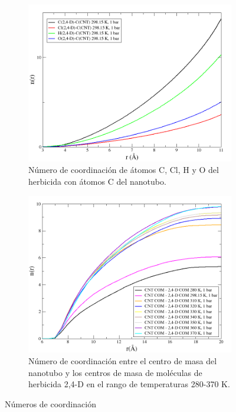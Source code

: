 \begin{figure}[!ht]
\begin{subfigure}{.5\textwidth}
  \centering
  \includegraphics[width=1\linewidth]{resultados/gr_24D_CNT_298_15_atom_atom_cn_alt.png}  
  \caption{Número de coordinación de átomos C, Cl, H y O del herbicida con átomos C del nanotubo.}
  \label{fig:24D_CNT_298_15_atom_atom_cn}
\end{subfigure}
\begin{subfigure}{.5\textwidth}
  \centering
  \includegraphics[width=1\linewidth]{resultados/cmnt_cmd_alltemp.png}  
  \caption{Número de coordinación entre el centro de masa del nanotubo y los centros de masa de moléculas de herbicida 2,4-D en el rango de temperaturas 280-370 K.}
  \label{fig:24D_CNT_alltemp_CM-CM_cn}
\end{subfigure}
\caption{Números de coordinación}
\label{fig:24D_CNT_298_15_alltemp_atom_atom_cn}
\end{figure}

